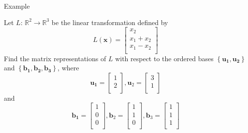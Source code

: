 \documentclass{beamer}
\begin{document}
\begin{frame}{Example}
\begin{example}
Let $L$: $\mathbb{R}^2\rightarrow \mathbb{R}^3$ be the linear transformation defined by
\begin{equation*}
    L\left( \mathbf{x} \right) =\left[ \begin{array}{c}
        x_2\\
        x_1+x_2\\
        x_1-x_2\\
    \end{array} \right]
\end{equation*}
Find the matrix representations of $L$ with respect to the ordered bases $\left\{ \mathbf{u}_{\mathbf{1}},\mathbf{u}_{\mathbf{2}} \right\}$ and $\left\{ \mathbf{b}_{\mathbf{1}},\mathbf{b}_{\mathbf{2}},\mathbf{b}_{\mathbf{3}} \right\}$, where
\begin{equation*}
    \mathbf{u}_{\mathbf{1}}=\left[ \begin{array}{c}
        1\\
        2\\
    \end{array} \right] , \mathbf{u}_2=\left[ \begin{array}{c}
        3\\
        1\\
    \end{array} \right]
\end{equation*}
\vspace{-2pt}
and
\vspace{-2pt}
\begin{equation*}
    \mathbf{b}_{\mathbf{1}}=\left[ \begin{array}{c}
        1\\
        0\\
        0\\
    \end{array} \right] , \mathbf{b}_2=\left[ \begin{array}{c}
        1\\
        1\\
        0\\
    \end{array} \right], \mathbf{b}_3=\left[ \begin{array}{c}
        1\\
        1\\
        1\\
    \end{array} \right]
\end{equation*}
\end{example}
\end{frame}
\end{document}
